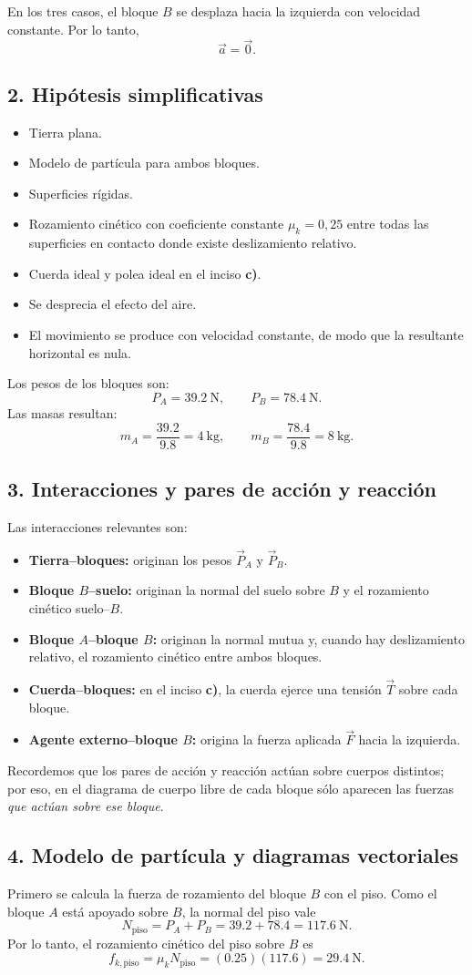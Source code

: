 \documentclass[12pt]{article}
\newcommand{\paso}[2]{%
  \subsection*{\color{AzulFisica}#1. #2}%
}
\begin{document}
En los tres casos, el bloque $B$ se desplaza hacia la izquierda con velocidad constante. Por lo tanto,
\[
\vec a=\vec 0.
\]

\paso{2}{Hipótesis simplificativas}
\begin{itemize}[itemsep=2pt]
  \item Tierra plana.
  \item Modelo de partícula para ambos bloques.
  \item Superficies rígidas.
  \item Rozamiento cinético con coeficiente constante $\mu_k=0,25$ entre todas las superficies en contacto donde existe deslizamiento relativo.
  \item Cuerda ideal y polea ideal en el inciso \textbf{c)}.
  \item Se desprecia el efecto del aire.
  \item El movimiento se produce con velocidad constante, de modo que la resultante horizontal es nula.
\end{itemize}

Los pesos de los bloques son:
\[
P_A=\SI{39.2}{\newton},
\qquad
P_B=\SI{78.4}{\newton}.
\]
Las masas resultan:
\[
m_A=\frac{39.2}{9.8}=\SI{4}{\kilogram},
\qquad
m_B=\frac{78.4}{9.8}=\SI{8}{\kilogram}.
\]

\paso{3}{Interacciones y pares de acción y reacción}
Las interacciones relevantes son:
\begin{itemize}[itemsep=2pt]
  \item \textbf{Tierra--bloques:} originan los pesos $\vec P_A$ y $\vec P_B$.
  \item \textbf{Bloque $B$--suelo:} originan la normal del suelo sobre $B$ y el rozamiento cinético suelo--$B$.
  \item \textbf{Bloque $A$--bloque $B$:} originan la normal mutua y, cuando hay deslizamiento relativo, el rozamiento cinético entre ambos bloques.
  \item \textbf{Cuerda--bloques:} en el inciso \textbf{c)}, la cuerda ejerce una tensión $\vec T$ sobre cada bloque.
  \item \textbf{Agente externo--bloque $B$:} origina la fuerza aplicada $\vec F$ hacia la izquierda.
\end{itemize}

Recordemos que los pares de acción y reacción actúan sobre cuerpos distintos; por eso, en el diagrama de cuerpo libre de cada bloque sólo aparecen las fuerzas \emph{que actúan sobre ese bloque}.

\paso{4}{Modelo de partícula y diagramas vectoriales}
Primero se calcula la fuerza de rozamiento del bloque $B$ con el piso. Como el bloque $A$ está apoyado sobre $B$, la normal del piso vale
\[
N_{\text{piso}}=P_A+P_B=39.2+78.4=\SI{117.6}{\newton}.
\]
Por lo tanto, el rozamiento cinético del piso sobre $B$ es
\[
f_{k,\text{piso}}=\mu_kN_{\text{piso}}=(0.25)(117.6)=\SI{29.4}{\newton}.
\]
\end{document}
